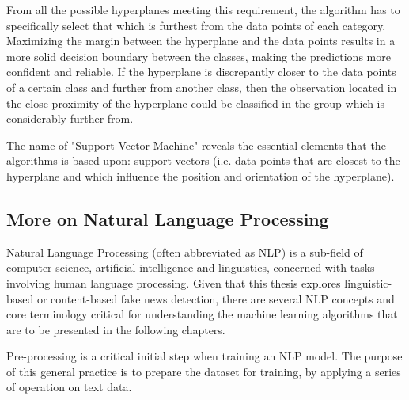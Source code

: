 From all the possible hyperplanes meeting this requirement, the algorithm has to specifically select that which is furthest from the data points of each category. Maximizing the margin between the hyperplane and the data points results in a more solid decision boundary between the classes, making the predictions more confident and reliable. If the hyperplane is discrepantly closer to the data points of a certain class and further from another class, then the observation located in the close proximity of the hyperplane could be classified in the group which is considerably further from.

The name of "Support Vector Machine" reveals the essential elements that the algorithms is based upon: support vectors (i.e. data points that are closest to the hyperplane and which influence the position and orientation of the hyperplane).


\subsection{More on Natural Language Processing}
Natural Language Processing (often abbreviated as NLP) is a sub-field of computer science, artificial intelligence and linguistics, concerned with tasks involving human language processing. Given that this thesis explores linguistic-based or content-based fake news detection, there are several NLP concepts and core terminology critical for understanding the machine learning algorithms that are to be presented in the following chapters.

Pre-processing is a critical initial step when training an NLP model. The purpose of this general practice is to prepare the dataset for training, by applying a series of operation on text data. 